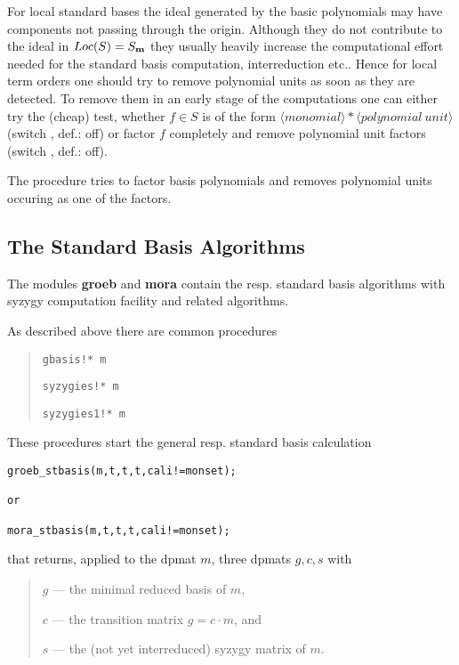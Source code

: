 For local standard bases the ideal generated by the basic polynomials
may have components not passing through the origin. Although they do
not contribute to the ideal in $Loc(S)=S_{\bf m}$ they usually 
heavily increase the computational effort needed for the standard basis 
computation, interreduction etc.. Hence for local
term orders one should try to remove polynomial units as soon as they
are detected. To remove them in an early stage of the computations
one can either try the (cheap) test, whether $f\in S$ is of the form
$\langle monomial\rangle *\langle polynomial\ unit\rangle$ (switch
, def.: off) or factor $f$ completely and remove
polynomial unit factors (switch , def.: off).

The procedure  tries to factor basis polynomials
and removes polynomial units occuring as one of the factors.

\subsection{The Standard Basis Algorithms}

The modules {\bf groeb} and {\bf mora} contain the \gr resp. standard
basis algorithms with syzygy computation facility and related
algorithms.  

As described above there are common procedures
\begin{quote}
\verb|gbasis!* m|


\verb|syzygies!* m|


\verb|syzygies1!* m|

\end{quote}

These procedures start the general \gr resp. standard basis
calculation
\begin{verbatim}
groeb_stbasis(m,t,t,t,cali!=monset);

or

mora_stbasis(m,t,t,t,cali!=monset);
\end{verbatim}
that returns, applied to the dpmat $m$, three dpmats $g,c,s$ with
\begin{quote}
$g$ --- the minimal reduced \gr basis of $m$,

$c$ --- the transition matrix $g=c\cdot m$, and

$s$ --- the (not yet interreduced) syzygy matrix of $m$.
\end{quote}

